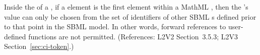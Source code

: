 Inside the  of a \FunctionDefinition, if a
 element is the first element within a MathML
, then the 's value can only be chosen from
the set of identifiers of other SBML \FunctionDefinition{}s
defined prior to that point in the SBML model.  In other words,
forward references to user-defined functions are not permitted.
(References: L2V2 Section~3.5.3; L2V3
Section~\ref{sec:ci-token}.)
